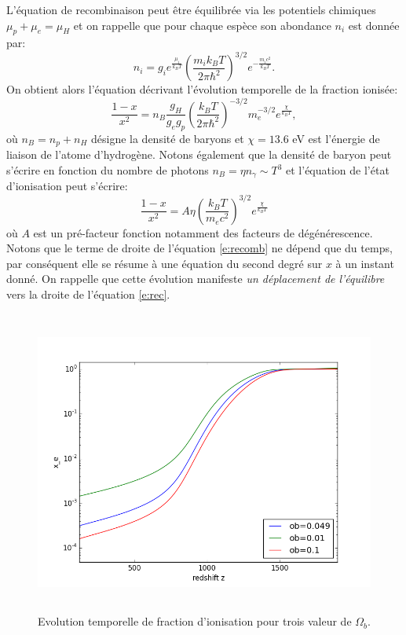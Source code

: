 L'équation de recombinaison peut être équilibrée via les potentiels chimiques $\mu_p+ \mu_e =\mu_H$ et on rappelle que pour chaque espèce son abondance $n_i$ est donnée par:
\begin{equation}
n_i=g_ie^{\frac{\mu_i}{k_BT}}\left(\frac{m_i k_B T}{2\pi\hbar^2}\right)^{3/2}e^{-\frac{m_i c^2}{k_B T}}.
\end{equation}
On obtient alors l'équation décrivant l'évolution temporelle de la fraction ionisée:
\begin{equation}
\frac{1-x}{x^2}=n_B \frac{g_H}{g_e g_p} \left(\frac{k_B T}{2\pi\hbar^2}\right)^{-3/2} m_e^{-3/2} e^{\frac{\chi}{k_B T}},
\end{equation}
où $n_B=n_p + n_H$ désigne la densité de baryons et $\chi=13.6$ eV est l'énergie de liaison de l'atome d'hydrogène. Notons également que la densité de baryon peut s'écrire en fonction du nombre de photons $n_B=\eta n_\gamma\sim T^3$ et l'équation de l'état d'ionisation peut s'écrire:
\begin{equation}
\frac{1-x}{x^2}=A \eta \left(\frac{k_B T}{m_e c^2}\right)^{3/2}e^{\frac{\chi}{k_B T}}
\label{e:recomb}
\end{equation}
où $A$ est un pré-facteur fonction notamment des facteurs de dégénérescence. Notons que le terme de droite de l'équation \ref{e:recomb} ne dépend que du temps, par conséquent elle se résume à une équation du second degré sur $x$ à un instant donné. On rappelle que cette évolution manifeste \textit{un déplacement de l'équilibre} vers  la droite de l'équation \ref{e:rec}.
\begin{figure}[htbp]
	\centering
		\includegraphics[height=10cm]{figs/recom.png}
		\caption{Evolution temporelle de fraction d'ionisation pour trois valeur de $\Omega_b$.}
	\label{f:recomb}
\end{figure}

